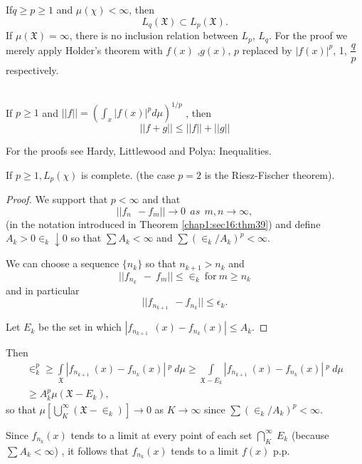 \begin{theorem}\label{chap1:sec16:thm38}
  If\pageoriginale $q \ge p \ge 1 $ and $\mu (\chi)< \infty$, then 
  $$
  L_q(\mathfrak{X}) \subset L_p(\mathfrak{X}).
  $$
  If $\mu (\mathfrak{X})=\infty $, there is no inclusion relation
  between $L_p$, $L_q $.
  For the proof we merely apply Holder's theorem with $f(x)$ ,$g(x)$, $p$
  replaced by $|f(x)|^p$, 1, $\dfrac{q}{p}$ respectively.
\end{theorem}

\begin{theorem}\label{chap1:sec16:thm39}
~\\
  If $p \ge 1$ and $||f||=(\int_x |f(x)|^p d\mu)^{1/p}$ , then
  $$
  ||f+g||\le||f||+||g||
  $$
  
  For the proofs see Hardy, Littlewood and Polya: Inequalities.
\end{theorem}

\begin{theorem}\label{chap1:sec16:thm40}
  If $p\ge 1, L_p(\chi)$ is complete. (the case $p=2$ is the
  Riesz-Fischer theorem). 
\end{theorem}
\begin{proof}
  We support that $p< \infty$ and that
  $$
  ||f_n ~~- f_m||\rightarrow 0 ~~as ~~m,n \rightarrow \infty,
  $$
  (in the notation introduced in Theorem \ref{chap1:sec16:thm39}) and define $A_k>0 \in_k
  \downarrow 0$ so that $\sum A_k <\infty$ and $\sum (\in_k/A_k)^p<
  \infty$. 
  
  We can choose a sequence $\{n_k \}$ so that $n_{k+1} >n_k$ and\\
  $$
  ||f_{n_k}~~-~f_m||\le \in_k ~\text{for}~ m \geq n_k
  $$
and in particular
$$
||f_{n_{k+1}}~~-f_{n_k}|| \le \epsilon_k.
$$

Let $E_k$ be the set in which $|f_{n_{k+1}}~~(x)-f_{n_k}(x)|\le A_k$. 
\end{proof}

Then\pageoriginale
\begin{gather*}
  \in^p_k \geq
  \int\limits_{\mathfrak{X}}|f_{n_{k+1}}~(x)-f_{n_k}(x)|~^p~d \mu \geq
  \int\limits_{\mathfrak{X}-E_k}|f_{n_{k+1}}~(x)-f_{n_k}(x)|~^p~d
  \mu \\ 
  \geq A^p_k \mu(\mathfrak{X}-E_k),
\end{gather*}
so that $\mu\left[\bigcup\limits^{\infty}_{K} (\mathfrak{X}-
  \in_k)\right]\rightarrow 0$ as $K 
\rightarrow \infty$ since $\sum(\in_k/A_k)^p<\infty$.

Since $f_{n_k}(x)$ tends to a limit at every point of each set
$\bigcap\limits^{\infty}_{K}~E_k$ (because $\sum A_k< \infty$) , it
  follows that $f_{n_k}(x)$ tends to a limit $f(x)$ p.p.

